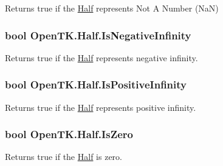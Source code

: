 Returns true if the \hyperlink{struct_open_t_k_1_1_half}{Half} represents Not A Number (Na\-N)

\hypertarget{struct_open_t_k_1_1_half_a89f7b3c1de64f30ffd030f63a868ddb3}{
\subsubsection[{Is\-Negative\-Infinity}]{\setlength{\rightskip}{0pt plus 5cm}bool Open\-T\-K.\-Half.\-Is\-Negative\-Infinity\hspace{0.3cm}{\ttfamily [get]}}}\label{struct_open_t_k_1_1_half_a89f7b3c1de64f30ffd030f63a868ddb3}


Returns true if the \hyperlink{struct_open_t_k_1_1_half}{Half} represents negative infinity.

\hypertarget{struct_open_t_k_1_1_half_a080c67842958aca474f5aa85f2d7c658}{
\subsubsection[{Is\-Positive\-Infinity}]{\setlength{\rightskip}{0pt plus 5cm}bool Open\-T\-K.\-Half.\-Is\-Positive\-Infinity\hspace{0.3cm}{\ttfamily [get]}}}\label{struct_open_t_k_1_1_half_a080c67842958aca474f5aa85f2d7c658}


Returns true if the \hyperlink{struct_open_t_k_1_1_half}{Half} represents positive infinity.

\hypertarget{struct_open_t_k_1_1_half_a48aeed7e4540b66deb01af091941a660}{
\subsubsection[{Is\-Zero}]{\setlength{\rightskip}{0pt plus 5cm}bool Open\-T\-K.\-Half.\-Is\-Zero\hspace{0.3cm}{\ttfamily [get]}}}\label{struct_open_t_k_1_1_half_a48aeed7e4540b66deb01af091941a660}


Returns true if the \hyperlink{struct_open_t_k_1_1_half}{Half} is zero.

